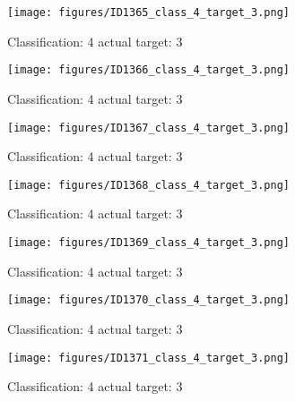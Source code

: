\begin{figure}[h!]
\begin{center}
\texttt{[image: figures/ID1365\_class\_4\_target\_3.png]}
\end{center}
\caption{ Classification: 4 actual target: 3}
\label{fig:ID1365_class_4_target_3}
\end{figure}
\begin{figure}[h!]
\begin{center}
\texttt{[image: figures/ID1366\_class\_4\_target\_3.png]}
\end{center}
\caption{ Classification: 4 actual target: 3}
\label{fig:ID1366_class_4_target_3}
\end{figure}
\begin{figure}[h!]
\begin{center}
\texttt{[image: figures/ID1367\_class\_4\_target\_3.png]}
\end{center}
\caption{ Classification: 4 actual target: 3}
\label{fig:ID1367_class_4_target_3}
\end{figure}
\begin{figure}[h!]
\begin{center}
\texttt{[image: figures/ID1368\_class\_4\_target\_3.png]}
\end{center}
\caption{ Classification: 4 actual target: 3}
\label{fig:ID1368_class_4_target_3}
\end{figure}
\begin{figure}[h!]
\begin{center}
\texttt{[image: figures/ID1369\_class\_4\_target\_3.png]}
\end{center}
\caption{ Classification: 4 actual target: 3}
\label{fig:ID1369_class_4_target_3}
\end{figure}
\begin{figure}[h!]
\begin{center}
\texttt{[image: figures/ID1370\_class\_4\_target\_3.png]}
\end{center}
\caption{ Classification: 4 actual target: 3}
\label{fig:ID1370_class_4_target_3}
\end{figure}
\begin{figure}[h!]
\begin{center}
\texttt{[image: figures/ID1371\_class\_4\_target\_3.png]}
\end{center}
\caption{ Classification: 4 actual target: 3}
\label{fig:ID1371_class_4_target_3}
\end{figure}
